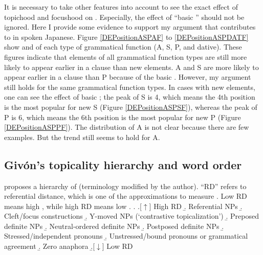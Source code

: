 It is necessary to take other features into account
to see the exact effect of topichood and focushood on .%
Especially, the effect of ``basic '' should not be ignored.
Here I provide some evidence to support my argument that
 contributes to  in spoken Japanese.
Figure \ref{DEPositionASPAF} to \ref{DEPositionASPDATF} show
 and  of each type of grammatical function (A, S, P, and dative).
These figures indicate that
 elements of all grammatical function types are still more likely to appear earlier in a clause than new elements.
A and S are more likely to appear earlier in a clause than P because of the basic .
However, my argument still holds for the same grammatical function types.
In cases with new elements,
one can see the effect of basic ;
the peak of S is 4,
which means the 4th position is the most popular for new S (Figure \ref{DEPositionASPSF}),
whereas the peak of P is 6, which means the 6th position is the most popular for new P (Figure \ref{DEPositionASPPF}).
The distribution of A is not clear because there are few examples.
But the trend still seems to hold for A.

\subsection{Giv\'on's topicality hierarchy and word order}\label{WO:Dis:Givon}

 proposes a hierarchy of  \Next (terminology modified by the author).
``RD'' refers to referential distance,
which is one of the approximations to measure .
Low RD means high ,
while high RD means low .
%
\ex.\label{TopicHierarchy}
 \a.[$\uparrow$] High RD
 \b. Referential  NPs
 \b. Cleft/focus constructions
 \b. Y-moved NPs (`contrastive topicalization')
 \b. Preposed definite NPs
 \b. Neutral-ordered definite NPs
 \b. Postposed definite NPs
 \b. Stressed/independent pronouns
 \b. Unstressed/bound pronouns or grammatical agreement
 \b. Zero anaphora
 \b.[$\downarrow$] Low RD
 \hfill{\cite[][7]{givon83}}

